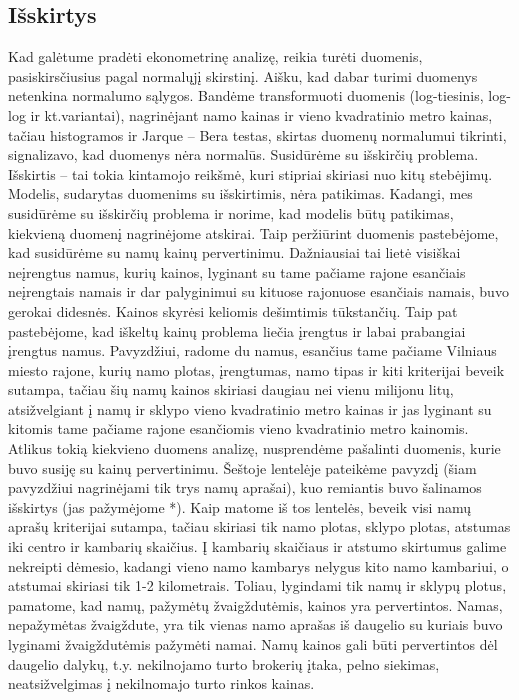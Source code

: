 \documentclass[a4paper]{article}
\begin{document}
\subsection{Išskirtys}
\hspace*{0,52cm}Kad galėtume pradėti ekonometrinę analizę, reikia turėti duomenis, pasiskirsčiusius pagal normalųjį skirstinį. Aišku, kad dabar turimi duomenys netenkina normalumo sąlygos. Bandėme transformuoti duomenis (log-tiesinis, log-log ir kt.variantai), nagrinėjant namo kainas ir vieno kvadratinio metro kainas, tačiau histogramos ir Jarque -- Bera testas, skirtas duomenų normalumui tikrinti, signalizavo, kad duomenys nėra normalūs. Susidūrėme su išskirčių problema.\\
\hspace*{0,52cm}Išskirtis -- tai tokia kintamojo reikšmė, kuri stipriai skiriasi nuo kitų stebėjimų. Modelis, sudarytas duomenims su išskirtimis, nėra patikimas. Kadangi, mes susidūrėme su išskirčių problema ir norime, kad modelis būtų patikimas, kiekvieną duomenį nagrinėjome atskirai. Taip peržiūrint duomenis pastebėjome, kad susidūrėme su namų kainų pervertinimu. Dažniausiai tai lietė visiškai neįrengtus namus, kurių kainos, lyginant su tame pačiame rajone esančiais neįrengtais namais ir dar palyginimui su kituose rajonuose esančiais namais, buvo gerokai didesnės. Kainos skyrėsi keliomis dešimtimis tūkstančių. Taip pat pastebėjome, kad iškeltų kainų problema liečia įrengtus ir labai prabangiai įrengtus namus. Pavyzdžiui, radome du namus, esančius tame pačiame Vilniaus miesto rajone, kurių namo plotas, įrengtumas, namo tipas ir kiti kriterijai beveik sutampa, tačiau šių namų kainos skiriasi daugiau nei vienu milijonu litų, atsižvelgiant į namų ir sklypo vieno kvadratinio metro kainas ir jas lyginant su kitomis tame pačiame rajone esančiomis vieno kvadratinio metro kainomis. Atlikus tokią kiekvieno duomens analizę, nusprendėme pašalinti duomenis, kurie buvo susiję su kainų pervertinimu. Šeštoje lentelėje pateikėme pavyzdį (šiam pavyzdžiui nagrinėjami tik trys namų aprašai), kuo remiantis buvo šalinamos išskirtys (jas pažymėjome *). Kaip matome iš tos lentelės, beveik visi namų aprašų kriterijai sutampa, tačiau skiriasi tik namo plotas, sklypo plotas, atstumas iki centro ir kambarių skaičius. Į kambarių skaičiaus ir atstumo skirtumus galime nekreipti dėmesio, kadangi vieno namo kambarys nelygus kito namo kambariui, o  atstumai skiriasi tik 1-2 kilometrais. Toliau, lygindami tik namų ir sklypų plotus, pamatome, kad namų, pažymėtų žvaigždutėmis, kainos yra pervertintos. Namas, nepažymėtas žvaigždute, yra tik vienas namo aprašas iš daugelio su kuriais buvo lyginami žvaigždutėmis pažymėti namai. Namų kainos gali būti pervertintos dėl daugelio dalykų, t.y. nekilnojamo turto brokerių įtaka, pelno siekimas, neatsižvelgimas į nekilnomajo turto rinkos kainas.
\end{document}
